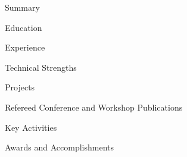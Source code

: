 \documentclass{resume}
\begin{document}

\begin{rSection}{Summary}

\end{rSection}


\begin{rSection}{Education}

\end{rSection}


\begin{rSection}{Experience}

\end{rSection}


    \begin{rSection}{Technical Strengths}
    
    \end{rSection}


\begin{rSection}{Projects}

\end{rSection}


\begin{rSection}{Refereed Conference and Workshop Publications}

\end{rSection}


\begin{rSection}{Key Activities}

\end{rSection}


\begin{rSection}{Awards and Accomplishments}

\end{rSection}
\end{document}
